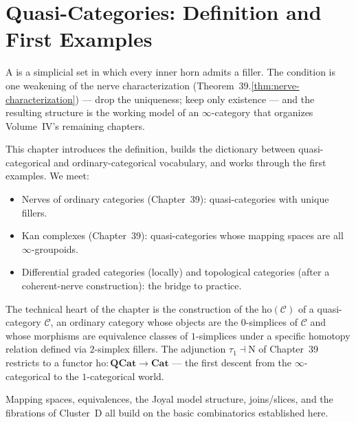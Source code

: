 
\chapter{Quasi-Categories: Definition and First Examples}

\begin{overviewbox}
A  is a simplicial set in which every inner horn
admits a filler. The condition is one weakening of the nerve
characterization (Theorem~39.\ref{thm:nerve-characterization}) — drop
the uniqueness; keep only existence — and the resulting structure is
the working model of an $\infty$-category that organizes Volume~IV's
remaining chapters.

This chapter introduces the definition, builds the dictionary between
quasi-categorical and ordinary-categorical vocabulary, and works through
the first examples. We meet:
\begin{itemize}
  \item Nerves of ordinary categories (Chapter~39): quasi-categories with
        unique fillers.
  \item Kan complexes (Chapter~39): quasi-categories whose mapping spaces
        are all $\infty$-groupoids.
  \item Differential graded categories (locally) and topological
        categories (after a coherent-nerve construction): the bridge to
        practice.
\end{itemize}

The technical heart of the chapter is the construction of the
 $\mathrm{ho}(\mathcal{C})$ of a quasi-category
$\mathcal{C}$, an ordinary category whose objects are the $0$-simplices of
$\mathcal{C}$ and whose morphisms are equivalence classes of $1$-simplices
under a specific homotopy relation defined via $2$-simplex fillers. The
adjunction $\tau_1 \dashv \mathrm{N}$ of Chapter~39 restricts to a
functor $\mathrm{ho} : \mathbf{QCat} \to \mathbf{Cat}$ — the first
descent from the $\infty$-categorical to the $1$-categorical world.

Mapping spaces, equivalences, the Joyal model structure, joins/slices,
and the fibrations of Cluster~D all build on the basic combinatorics
established here.
\end{overviewbox}


